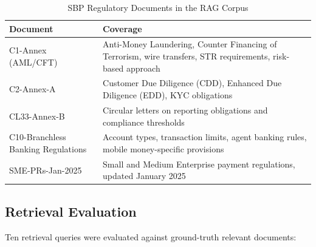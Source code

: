 \documentclass[12pt,a4paper]{article}
\begin{document}
\begin{table}[H]
\centering
\caption{SBP Regulatory Documents in the RAG Corpus}
\label{tab:rag_corpus}
\begin{tabular}{lp{8cm}}
\toprule
\textbf{Document} & \textbf{Coverage} \\
\midrule
C1-Annex (AML/CFT) & Anti-Money Laundering, Counter Financing of Terrorism, wire transfers, STR requirements, risk-based approach \\
C2-Annex-A & Customer Due Diligence (CDD), Enhanced Due Diligence (EDD), KYC obligations \\
CL33-Annex-B & Circular letters on reporting obligations and compliance thresholds \\
C10-Branchless Banking Regulations & Account types, transaction limits, agent banking rules, mobile money-specific provisions \\
SME-PRs-Jan-2025 & Small and Medium Enterprise payment regulations, updated January 2025 \\
\bottomrule
\end{tabular}
\end{table}

\subsection{Retrieval Evaluation}

Ten retrieval queries were evaluated against ground-truth relevant documents:
\end{document}
